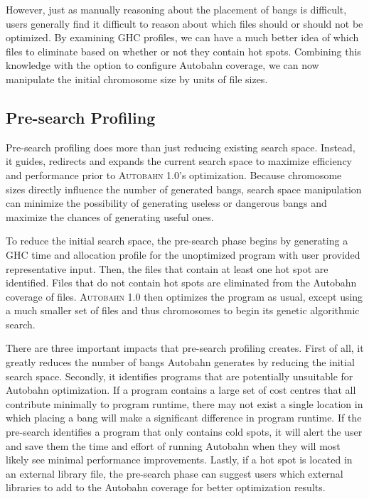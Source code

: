 \documentclass[format=sigplan, review=true]{acmart}
\newcommand{\hotspot}[0]{hot spot}
\newcommand{\hotspots}[0]{hot spots}
\newcommand{\coldspots}[0]{cold spots}
\newcommand{\dangerous}[0]{dangerous}
\newcommand{\useful}[0]{useful}
\newcommand{\useless}[0]{useless}
\newcommand{\Ao}[0]{\textsc{Autobahn 1.0}}
\newcommand{\preopt}[0]{pre-search}
\newcommand{\Preopt}[0]{Pre-search}
\begin{document}
However, just as manually reasoning about the placement of bangs is difficult, users generally find it difficult to reason about which files should or should not be optimized. By examining GHC profiles, we can have a much better idea of which files to eliminate based on whether or not they contain \hotspots{}. Combining this knowledge with the option to configure Autobahn coverage, we can now manipulate the initial chromosome size by units of file sizes. 

\subsection{\Preopt{} Profiling}

\Preopt{} profiling does more than just reducing existing search space. Instead, it guides, redirects and expands the current search space to maximize efficiency and performance prior to \Ao{}'s optimization. Because chromosome sizes directly influence the number of generated bangs, search space manipulation can minimize the possibility of generating \useless{} or \dangerous{} bangs and maximize the chances of generating \useful{} ones.

To reduce the initial search space, the \preopt{} phase begins by generating a GHC time and allocation profile for the unoptimized program with user provided representative input. Then, the files that contain at least one \hotspot{} are identified. Files that do not contain \hotspots{} are eliminated from the Autobahn coverage of files. \Ao{} then optimizes the program as usual, except using a much smaller set of files and thus chromosomes to begin its genetic algorithmic search. 

There are three important impacts that \preopt{} profiling creates. First of all, it greatly reduces the number of bangs Autobahn generates by reducing the initial search space. Secondly, it identifies programs that are potentially unsuitable for Autobahn optimization. If a program contains a large set of cost centres that all contribute minimally to program runtime, there may not exist a single location in which placing a bang will make a significant difference in program runtime. If the \preopt{} identifies a program that only contains \coldspots{}, it will alert the user and save them the time and effort of running Autobahn when they will most likely see minimal performance improvements. Lastly, if a \hotspot{} is located in an external library file, the \preopt{} phase can suggest users which external libraries to add to the Autobahn coverage for better optimization results.
\end{document}
